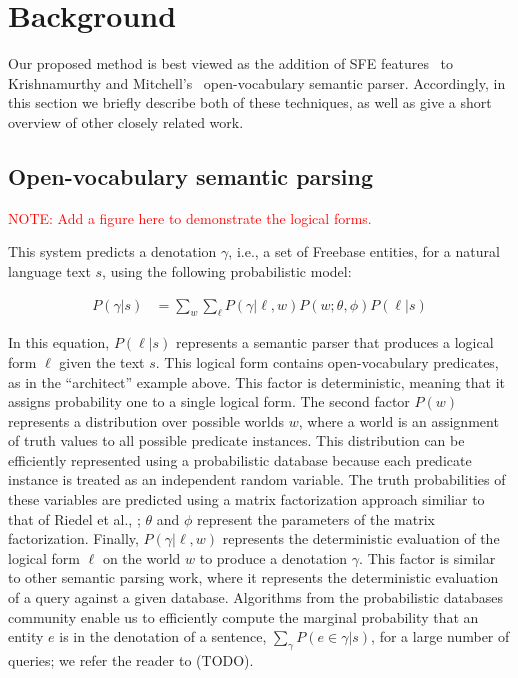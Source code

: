 \documentclass[11pt]{article}
\newcommand{\mattnote}[1]{\textcolor{red}{NOTE: #1}}
\begin{document}
\section{Background}
\label{sec:background}

Our proposed method is best viewed as the addition of SFE
features~\cite{gardner-2015-sfe} to Krishnamurthy and
Mitchell's~
open-vocabulary semantic parser.  Accordingly, in this section we briefly
describe both of these techniques, as well as give a short overview of other
closely related work.

\subsection{Open-vocabulary semantic parsing}
\label{sec:jayant-semparse}

\mattnote{Add a figure here to demonstrate the logical forms.}

This system predicts a denotation $\gamma$, i.e., a set of Freebase
entities, for a natural language text $s$, using the following
probabilistic model:

\begin{align*}
P(\gamma | s) & = \sum_w \sum_\ell P(\gamma | \ell, w) P(w ; \theta, \phi) P(\ell | s)
\end{align*}

In this equation, $P(\ell | s)$ represents a semantic parser that
produces a logical form $\ell$ given the text $s$. This logical form
contains open-vocabulary predicates, as in the ``architect'' example
above. This factor is deterministic, meaning that it assigns
probability one to a single logical form. The second factor $P(w)$
represents a distribution over possible worlds $w$, where a world is
an assignment of truth values to all possible predicate
instances. This distribution can be efficiently represented using a
probabilistic database because each predicate instance is treated as
an independent random variable. The truth probabilities of these
variables are predicted using a matrix factorization approach similiar
to that of Riedel et al., ;
$\theta$ and $\phi$ represent the parameters of the matrix
factorization. Finally, $P(\gamma | \ell, w)$ represents the
deterministic evaluation of the logical form $\ell$ on the world $w$
to produce a denotation $\gamma$. This factor is similar to other
semantic parsing work, where it represents the deterministic
evaluation of a query against a given database. Algorithms from the
probabilistic databases community enable us to efficiently compute the
marginal probability that an entity $e$ is in the denotation of a
sentence, $\sum_\gamma P(e \in \gamma | s)$, for a large number of
queries; we refer the reader to (TODO).
\end{document}

